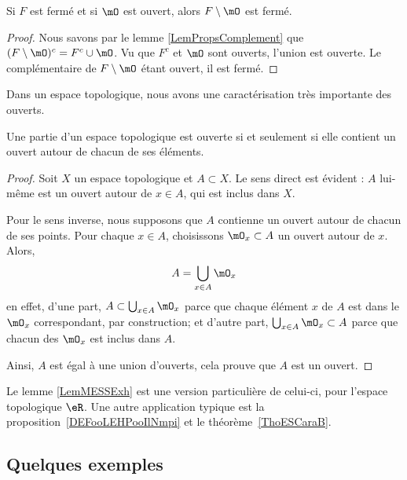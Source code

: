 \begin{lemma}       \label{LEMooSFMZooBguLdf}
	Si \( F\) est fermé et si \( \mO\) est ouvert, alors \( F\setminus \mO \) est fermé.
\end{lemma}

\begin{proof}
	Nous savons par le lemme \ref{LemPropsComplement} que $(F\setminus \mO)^c=F^c\cup\mO$. Vu que \( F^c\) et \( \mO\) sont ouverts, l'union est ouverte. Le complémentaire de \( F\setminus \mO\) étant ouvert, il est fermé.
\end{proof}

Dans un espace topologique, nous avons une caractérisation très importante des ouverts.
\begin{theorem}		\label{ThoPartieOUvpartouv}
	Une partie d'un espace topologique est ouverte si et seulement si elle contient un ouvert autour de chacun de ses éléments.
\end{theorem}

\begin{proof}
	Soit \( X\) un espace topologique et \( A\subset X\). Le sens direct est évident : \( A\) lui-même est un ouvert autour de \( x\in A\), qui est inclus dans \( X\).

	Pour le sens inverse, nous supposons que \( A\) contienne un ouvert autour de chacun de ses points. Pour chaque \( x\in A\), choisissons \( \mO_x\subset A\) un ouvert autour de \( x\). Alors,
	\begin{equation}	\label{EqAUniondesOx}
		A=\bigcup_{x\in A}\mO_x
	\end{equation}
	en effet, d'une part, \( A\subset\bigcup_{x\in A}\mO_x\) parce que chaque élément \( x\) de \( A\) est dans le \( \mO_x\) correspondant, par construction; et d'autre part, \( \bigcup_{x\in A}\mO_x\subset A\) parce que chacun des \( \mO_x\) est inclus dans \( A\).

	Ainsi, \( A\) est égal à une union d'ouverts, cela prouve que \( A\) est un ouvert.
\end{proof}
Le lemme \ref{LemMESSExh} est une version particulière de celui-ci, pour l'espace topologique \( \eR \). Une autre application typique est la proposition~\ref{DEFooLEHPooIlNmpi} et le théorème~\ref{ThoESCaraB}.

\subsection{Quelques exemples}

